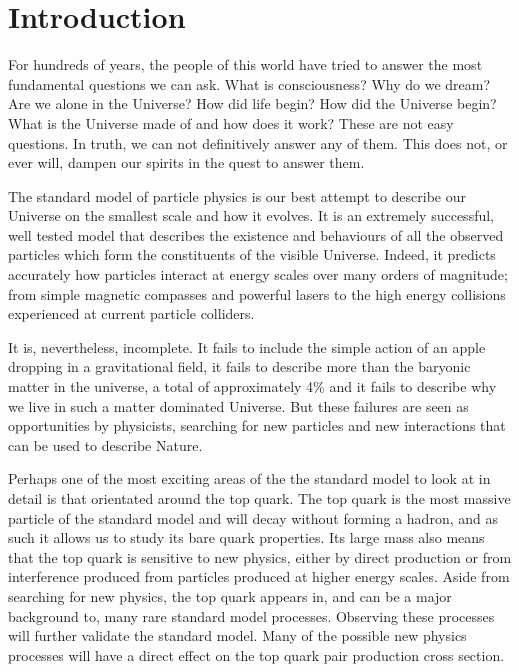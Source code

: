 
\chapter{Introduction}
\label{ch:Introduction}

For hundreds of years, the people of this world have tried to answer the most fundamental questions we can ask.
What is consciousness?
Why do we dream?
Are we alone in the Universe?
How did life begin?
How did the Universe begin?
What is the Universe made of and how does it work?
These are not easy questions.
In truth, we can not definitively answer any of them.
This does not, or ever will, dampen our spirits in the quest to answer them.

The standard model of particle physics is our best attempt to describe our Universe on the smallest scale and how it evolves.
It is an extremely successful, well tested model that describes the existence and behaviours of all the observed particles which form the constituents of the visible Universe.
Indeed, it predicts accurately how particles interact at energy scales over many orders of magnitude; from simple magnetic compasses and powerful lasers to the high energy collisions experienced at current particle colliders.

It is, nevertheless, incomplete.
It fails to include the simple action of an apple dropping in a gravitational field, it fails to describe more than the baryonic matter in the universe, a total of approximately 4\% and it fails to describe why we live in such a matter dominated Universe.
But these failures are seen as opportunities by physicists, searching for new particles and new interactions that can be used to describe Nature.

Perhaps one of the most exciting areas of the the standard model to look at in detail is that orientated around the top quark.
The top quark is the most massive particle of the standard model and will decay without forming a hadron, and as such it allows us to study its bare quark properties.
Its large mass also means that the top quark is sensitive to new physics, either by direct production or from interference produced from particles produced at higher energy scales.
Aside from searching for new physics, the top quark appears in, and can be a major background to, many rare standard model processes.
Observing these processes will further validate the standard model. 
Many of the possible new physics processes will have a direct effect on the top quark pair production cross section.

